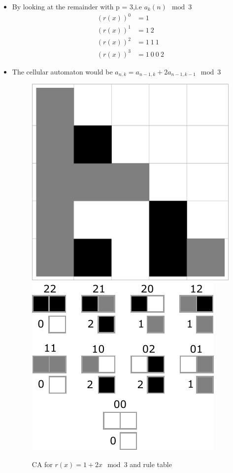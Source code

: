 \documentclass{beamer}
\begin{document}
\begin{frame}
    \begin{itemize}
        \item By looking at the remainder with p = 3,i.e $a_k(n)\mod3$ 
        \begin{align*}
            (r(x))^0 &= 1 \\
            (r(x))^1 &= 1 \ 2 \\
            (r(x))^2 &= 1 \ 1 \ 1 \\
            (r(x))^3 &= 1 \ 0 \ 0 \ 2
        \end{align*}
        \item The cellular automaton would be $a_{n,k} = a_{n-1,k} + 2a_{n-1,k-1} \mod 3$
        \begin{figure}
            \centering
            \includegraphics[scale=0.3]{Mod3Poly.pdf}
            \includegraphics[scale=0.6]{genPolyRule.pdf}
            \caption{CA for $r(x) = 1 + 2x \mod 3$ and rule table}
        \end{figure}
    \end{itemize}
\end{frame}
\end{document}
